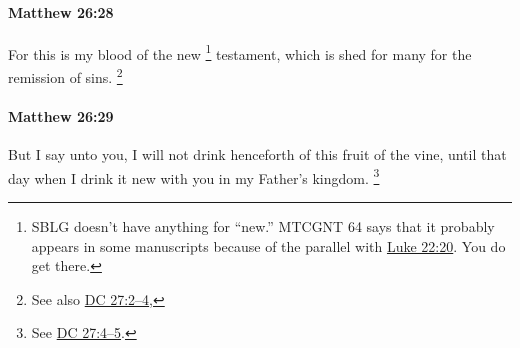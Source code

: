		\paragraph{Matthew 26:28} %
			\label{MATTHEW-26-28}

			For this is my blood of the new%
				\footnote{%
					SBLG doesn't have anything for ``new.'' MTCGNT 64 says that it probably appears in some manuscripts because of the parallel with \hyperref[LUKE-22-20]{Luke 22:20}. You do get  there.
					}
			testament, which is shed for many for the remission of sins.%
				\footnote{%
					See also \hyperref[DC27-2]{DC 27:2--4}, 
					}

			\begin{framed}
			\scriptsize
				\begin{compactdesc}
					\item[SBLG]  \hyperref[DIATHEKE]{}  \hyperref[EKCHEO]{}  \hyperref[APHESIS]{} \hyperref[HAMARTIA]{}
				\end{compactdesc}
			\end{framed}

		\paragraph{Matthew 26:29} %
			\label{MATTHEW-26-29}

			But I say unto you, I will not drink henceforth of this fruit of the vine, until that day when I drink it new with you in my Father's kingdom.%
				\footnote{%
					See \hyperref[DC27-4]{DC 27:4--5}.
					}

